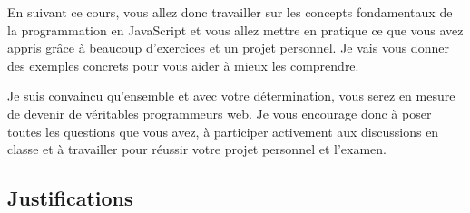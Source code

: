 En suivant ce cours, vous allez donc travailler sur les concepts fondamentaux de la programmation en JavaScript et vous allez mettre en pratique ce que vous avez appris grâce à beaucoup d'exercices et un projet personnel. Je vais vous donner des exemples concrets pour vous aider à mieux les comprendre.

Je suis convaincu qu’ensemble et avec votre détermination, vous serez en mesure de devenir de véritables programmeurs web. Je vous encourage donc à poser toutes les questions que vous avez, à participer activement aux discussions en classe et à travailler pour réussir votre projet personnel et l’examen.

\subsection{Justifications}
